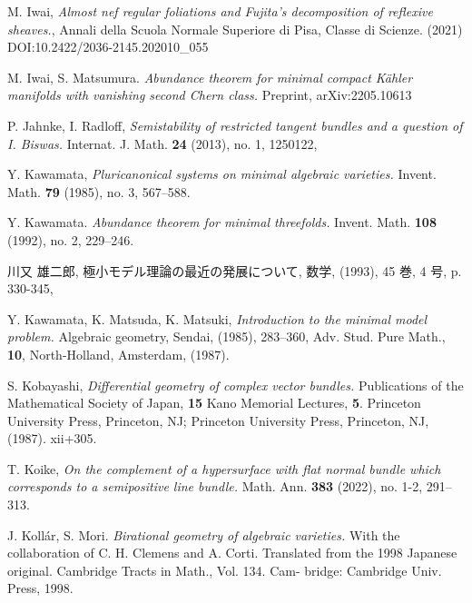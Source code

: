 \documentclass[12pt]{amsart}
\theoremstyle{definition}
\theoremstyle{remark}
\begin{document}
\begin{thebibliography}{n}
M. Iwai,
\textit{Almost nef regular foliations and Fujita's decomposition of reflexive sheaves.}, 
Annali della Scuola Normale Superiore di Pisa, Classe di Scienze. (2021) DOI:10.2422/2036-2145.202010\_055

M. Iwai, S. Matsumura.
\textit{Abundance theorem for minimal compact K\"ahler manifolds with vanishing second Chern class.}
Preprint, arXiv:2205.10613



P. Jahnke, I. Radloff,
\textit{Semistability of restricted tangent bundles and a question of I. Biswas.}
 Internat. J. Math.  {\bf 24}  (2013),  no. 1, 1250122,


 Y. Kawamata,
 \textit{Pluricanonical systems on minimal algebraic varieties.}
 Invent. Math.  {\bf{79}}  (1985),  no. 3, 567--588.
 

 Y. Kawamata. 
\textit{Abundance theorem for minimal threefolds.}
 Invent. Math.  {\bf{108}}  (1992),  no. 2, 229--246.
 
 川又 雄二郎, 極小モデル理論の最近の発展について, 数学, (1993), 45 巻, 4 号, p. 330-345, 
 
 Y. Kawamata, K. Matsuda, K. Matsuki, 
 \textit{Introduction to the minimal model problem.}
 Algebraic geometry, Sendai, (1985), 
 283--360, Adv. Stud. Pure Math., {\bf{10}}, North-Holland, Amsterdam, (1987).

S. Kobayashi, 
\textit{Differential geometry of complex vector bundles.}
Publications of the Mathematical Society of Japan, {\bf{15}} 
Kano Memorial Lectures, {\bf{5}}.
Princeton University Press, Princeton, NJ; Princeton University Press, Princeton, NJ,  (1987). {\rm xii}+305.

T. Koike, 
\textit{On the complement of a hypersurface with flat normal bundle which corresponds to a semipositive line bundle.}
 Math. Ann.  {\bf{383}}  (2022),  no. 1-2, 291--313.


 J. Koll\'ar, S. Mori. 
\textit{Birational geometry of algebraic varieties.} 
With the collaboration of C. H. Clemens and A. Corti. Translated from the 1998 Japanese original. 
Cambridge Tracts in Math., Vol. 134. Cam- bridge: Cambridge Univ. Press, 1998.


\end{thebibliography}
\end{document}

